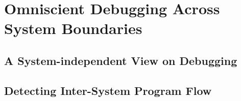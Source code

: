 \chapter{Omniscient Debugging Across System Boundaries}

\section{A System-independent View on Debugging}

\section{Detecting Inter-System Program Flow}

